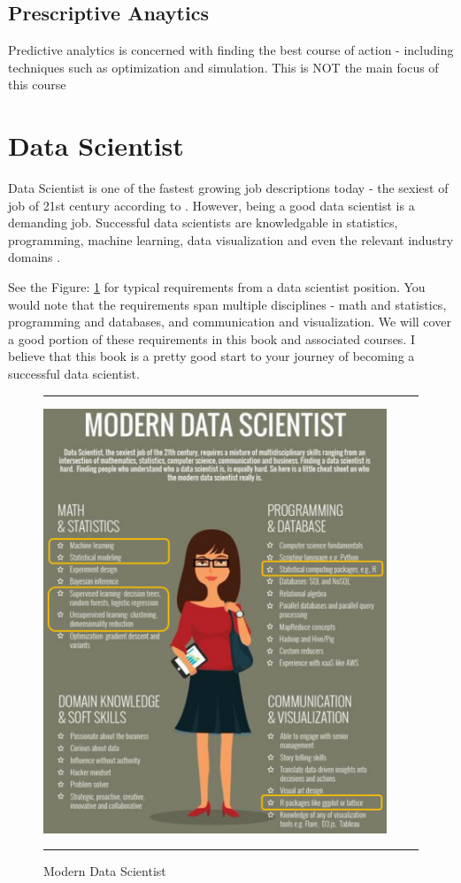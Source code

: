 \documentclass[11pt, letterpaper, twoside]{memoir}\usepackage{knitr}
\begin{document}
\subsection{Prescriptive Anaytics}

Predictive analytics is concerned with finding the best course of action - including techniques such as optimization and simulation. This is NOT the main focus of this course

\section{Data Scientist}

Data Scientist is one of the fastest growing job descriptions today - the sexiest of job of 21st century according to \citet{patil2012data}.  However, being a good data scientist is a demanding job. Successful data scientists are knowledgable in statistics, programming, machine learning, data visualization and even the relevant industry domains \citep{8SkillsY88:online}.

See the Figure: \ref{fig:datascientist} for typical requirements from a data scientist position. You would note that the requirements span multiple disciplines - math and statistics, programming and databases, and communication and visualization. We will cover a good portion of these requirements in this book and associated courses. I believe that this book is a pretty good start to your journey of becoming a successful data scientist.

\begin{figure}
\rule{4in}{1pt}
\centering
\includegraphics[height=5in]{images/datascientist.png}
\caption{Modern Data Scientist}
\label{fig:datascientist}
\rule{4in}{1pt}
\end{figure}
\end{document}
